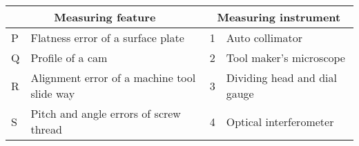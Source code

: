 \begin{center}
\begin{tabular}{|p{1cm}|p{5.2cm}|p{1cm}|p{4cm}|}
\hline
\multicolumn{2}{|c|}{Measuring feature} & \multicolumn{2}{c|}{Measuring instrument} \\
\hline
P & Flatness error of a surface plate & 1 & Auto collimator \\
\hline
Q & Profile of a cam & 2 & Tool maker's microscope \\
\hline
R & Alignment error of a machine tool slide way & 3 & Dividing head and dial gauge \\
\hline
S & Pitch and angle errors of screw thread & 4 & Optical interferometer \\
\hline
\end{tabular}
\end{center}